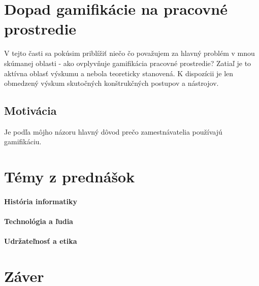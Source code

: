\documentclass{article}
\begin{document}
\section{Dopad gamifikácie na pracovné prostredie} \label{dopad}
V tejto časti sa pokúsim priblížiť niečo čo považujem za hlavný problém v mnou skúmanej oblasti - ako ovplyvňuje gamifikácia pracovné prostredie? Zatiaľ je to aktívna oblasť výskumu a nebola teoreticky stanovená. K dispozícii je len obmedzený výskum skutočných konštrukčných postupov a nástrojov\cite{10.1145/2818187.2818299}.

\subsection{Motivácia}
Je podľa môjho názoru hlavný dôvod prečo zamestnávatelia používajú gamifikáciu. 

\section{Témy z prednášok} \label{prednasky}
\paragraph{História informatiky}
\paragraph{Technológia a ľudia}
\paragraph{Udržateľnosť a etika}

\section{Záver} \label{zaver} %





 
\label{referencie}
\end{document}
